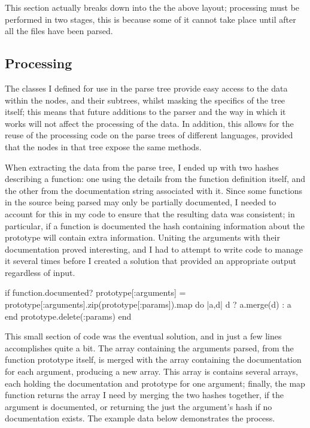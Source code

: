 This section actually breaks down into the the above layout; processing must be
performed in two stages, this is because some of it cannot take place until
after all the files have been parsed.

  \subsection{Processing}
    The classes I defined for use in the parse tree provide easy access to the
    data within the nodes, and their subtrees, whilst masking the specifics of
    the tree itself; this means that future additions to the parser and the way
    in which it works will not affect the processing of the data. In addition,
    this allows for the reuse of the processing code on the parse trees of
    different languages, provided that the nodes in that tree expose the same
    methods.

    When extracting the data from the parse tree, I ended up with two hashes
    describing a function: one using the details from the function definition
    itself, and the other from the documentation string associated with it.
    Since some functions in the source being parsed may only be partially
    documented, I needed to account for this in my code to ensure that the
    resulting data was consistent; in particular, if a function is documented
    the hash containing information about the prototype will contain extra
    information. Uniting the arguments with their documentation proved
    interesting, and I had to attempt to write code to manage it several times
    before I created a solution that provided an appropriate output regardless
    of input.

    \begin{code}[language=ruby, gobble=6]
      if function.documented?
        prototype[:arguments] = prototype[:arguments].zip(prototype[:params]).map do |a,d|
          d ? a.merge(d) : a
        end
        prototype.delete(:params)
      end
    \end{code}

    This small section of code was the eventual solution, and in just a few
    lines accomplishes quite a bit. The array containing the arguments
    parsed, from the function prototype itself, is merged with the array
    containing the documentation for each argument, producing a new array. This
    array is contains several arrays, each holding the documentation and
    prototype for one argument; finally, the map function returns the array I
    need by merging the two hashes together, if the argument is documented, or
    returning the just the argument's hash if no documentation exists. The
    example data below demonstrates the process.

